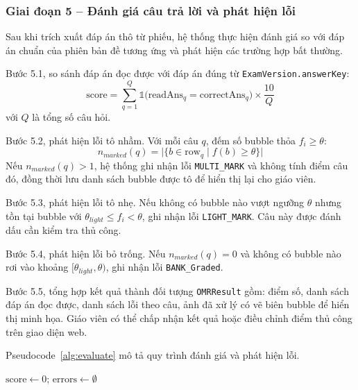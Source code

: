 ﻿\documentclass[../DoAn.tex]{subfiles}
\begin{document}
\subsubsection{Giai đoạn 5 -- Đánh giá câu trả lời và phát hiện lỗi}
Sau khi trích xuất đáp án thô từ phiếu, hệ thống thực hiện đánh giá so với đáp án chuẩn của phiên bản đề tương ứng và phát hiện các trường hợp bất thường.

Bước 5.1, so sánh đáp án đọc được với đáp án đúng từ \texttt{ExamVersion.answerKey}:
\begin{equation}
    \text{score} = \sum_{q=1}^{Q} \mathbb{1}\bigl( \text{readAns}_q = \text{correctAns}_q \bigr) \times \frac{10}{Q}
\end{equation}
với $Q$ là tổng số câu hỏi.

Bước 5.2, phát hiện lỗi tô nhầm. Với mỗi câu $q$, đếm số bubble thỏa $f_i \ge \theta$:
\begin{equation}
    n_{marked}(q) = \bigl| \{ b \in \text{row}_q \mid f(b) \ge \theta \} \bigr|
\end{equation}
Nếu $n_{marked}(q) > 1$, hệ thống ghi nhận lỗi \texttt{MULTI\_MARK} và không tính điểm câu đó, đồng thời lưu danh sách bubble được tô để hiển thị lại cho giáo viên.

Bước 5.3, phát hiện lỗi tô nhẹ. Nếu không có bubble nào vượt ngưỡng $\theta$ nhưng tồn tại bubble với $\theta_{light} \le f_i < \theta$, ghi nhận lỗi \texttt{LIGHT\_MARK}. Câu này được đánh dấu cần kiểm tra thủ công.

Bước 5.4, phát hiện lỗi bỏ trống. Nếu $n_{marked}(q) = 0$ và không có bubble nào rơi vào khoảng $[\theta_{light}, \theta)$, ghi nhận lỗi \texttt{BANK\_Graded}.

Bước 5.5, tổng hợp kết quả thành đối tượng \texttt{OMRResult} gồm: điểm số, danh sách đáp án đọc được, danh sách lỗi theo câu, ảnh đã xử lý có vẽ biên bubble để hiển thị minh họa. Giáo viên có thể chấp nhận kết quả hoặc điều chỉnh điểm thủ công trên giao diện web.

Pseudocode~\ref{alg:evaluate} mô tả quy trình đánh giá và phát hiện lỗi.

\begin{algorithm}[H]
\caption{Đánh giá câu trả lời và phát hiện lỗi}
\label{alg:evaluate}
\SetAlgoLined
{}
 $\text{score} \gets 0$; $\text{errors} \gets \emptyset$ \;
  \;
\end{algorithm}
\end{document}
